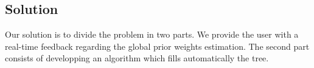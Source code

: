\subsection{Solution}
Our solution is to divide the problem in two parts. We provide the user with a real-time feedback regarding the global prior weights estimation.
The second part consists of developping an algorithm which fills automatically the tree.
%
%
%
%
